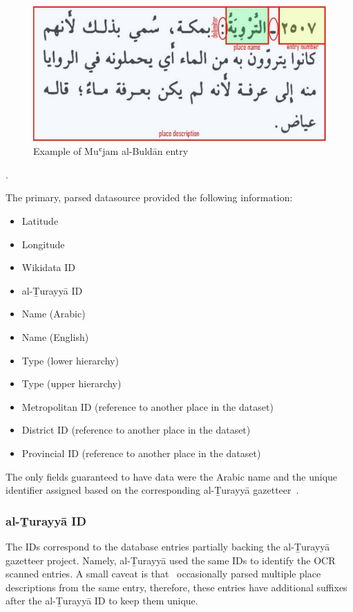 \begin{figure}[h] %
    \centering %
    \includegraphics[width=0.8\linewidth]{figures/yaqut-layout} %
    \caption{Example of Muʿjam al-Buldān entry ~\cite{YaqutRB}} %
    \label{fig:yaqut-structure} %
\end{figure}.

The primary, parsed datasource provided the following information:
\begin{itemize}
    \item Latitude
    \item Longitude
    \item Wikidata ID
    \item al-Ṯurayyā ID~\cite{AlTurayya}
    \item Name (Arabic)
    \item Name (English)
    \item Type (lower hierarchy)
    \item Type (upper hierarchy)
    \item Metropolitan ID (reference to another place in the dataset)
    \item District ID (reference to another place in the dataset)
    \item Provincial ID (reference to another place in the dataset)
\end{itemize}


The only fields guaranteed to have data were the Arabic name and the unique identifier assigned based on the corresponding al-Ṯurayyā gazetteer~\cite{AlTurayya}.

\subsubsection{al-Ṯurayyā ID}
The IDs correspond to the database entries partially backing the al-Ṯurayyā gazetteer project.
Namely, al-Ṯurayyā used the same IDs to identify the OCR scanned entries.
A small caveat is that~\cite{YaqutRB} occasionally parsed multiple place descriptions from the same entry,
therefore, these entries have additional suffixes after the al-Ṯurayyā ID to keep them unique.

